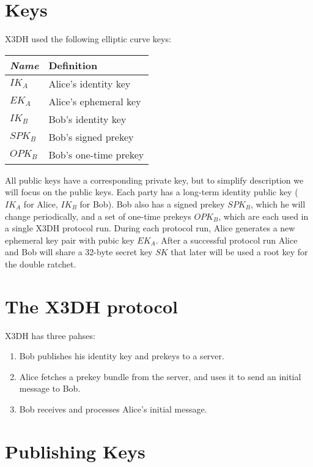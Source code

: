 \section{Keys}
\label{sec:Keys}

X3DH used the following elliptic curve keys:

\begin{center}
\begin{tabular}{>{\itshape}l l}
\toprule
Name & Definition \\
\midrule
$IK_A$ & Alice’s identity key \\
$EK_A$ & Alice’s ephemeral key \\
$IK_B$ & Bob’s identity key \\
$SPK_B$ & Bob’s signed prekey \\
$OPK_B$ & Bob’s one-time prekey \\
\bottomrule
\end{tabular}
\end{center}

All public keys have a corresponding private key, but to simplify description we will focus on the public keys. Each party has a long-term identity public key ($IK_A$ for Alice, $IK_B$ for Bob). Bob also has a signed prekey $SPK_B$, which he will change periodically, and a set of one-time prekeys $OPK_B$, which are each used in a single X3DH protocol run. During each protocol run, Alice generates a new ephemeral key pair with pubic key $EK_A$. After a successful protocol run Alice and Bob will share a 32-byte secret key $SK$ that later will be used a root key for the double ratchet.

\section{The X3DH protocol}
\label{sec:TheX3DHProtocol}

X3DH has three pahses:

\begin{enumerate}
  \item Bob publishes his identity key and prekeys to a server.
  \item Alice fetches a prekey bundle from the server, and uses it to send an initial message to Bob.
  \item Bob receives and processes Alice's initial message.
\end{enumerate}

\section{Publishing Keys}
\label{sec:PublishingKeys}

